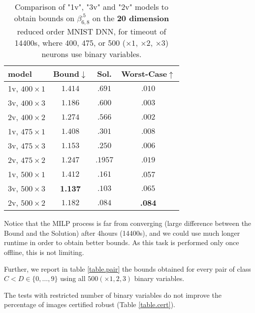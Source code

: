 \begin{table}[h!]
	\centering
	\begin{tabular}{||l||c|c|c||}\hline\hline
		model &        Bound$\downarrow$ &  Sol. &      Worst-Case$\uparrow$ \\\hline \hline
1v, $400 \times 1$ & $1.414$ &  $.691$ & $.010$ \\\hline 
3v, $400 \times 3$ & $1.186$ & $.600$ & $.003$ \\\hline 
2v, $400 \times 2$ & $1.274$ & $.566$ & $.002$ \\\hline\hline
	 
1v, $475 \times 1$ &  $1.408$ & $.301$ & $.008$  \\\hline 
3v, $475 \times 3$ &  $1.153$ & $.250$ & $.006$ \\ \hline 
2v, $475 \times 2$ &  $1.247$ & $.1957$ & $.019$ \\\hline\hline

1v, $500 \times 1$ & $1.412$ & $.161$ & .057 \\\hline 
3v, $500 \times 3$ & {\bf 1.137} & $.103$ & $.065$\\\hline 
2v, $500 \times 2$ &  $1.182$ & $.084$& {\bf .084}  \\\hline\hline
	 
	\end{tabular}
	\caption{Comparison of "1v", "3v" and "2v" models 
	to obtain bounds on $\beta^{.5}_{6,8}$ on the {\bf 20 dimension} reduced order MNIST DNN, for timeout of 14400s, 
	where 400, 475,  or 500 ($\times 1$, $\times 2$, $\times 3$) neurons use binary variables.}
	\label{table.reduced}
\end{table}


Notice that the MILP process is far from converging (large difference between the Bound and the Solution) after 4hours (14400s), and we could use much longer 
runtime in order to obtain better bounds. As this task is performed only once offline, this is not limiting.

Further, we report in table \ref{table.pair} the bounds obtained for every pair of class $C < D \in \{0, \ldots, 9\}$
using all $500 (\times 1,2,3) $ binary variables.





The tests with restricted number of binary variables do not improve the percentage of images certified robust (Table \ref{table.cert}). 

